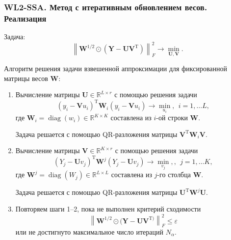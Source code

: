 \documentclass[10pt, ucs, notheorems, handout]{beamer}
\DeclareMathOperator{\diag}{diag}
\newcommand{\norm}[1]{\left\lVert#1\right\rVert}
\begin{document}
\begin{frame}
\frametitle{WL2-SSA. Метод с итеративным обновлением весов. Реализация}
\small Задача: 
\begin{equation*}
\norm{\mathbf{W}^{1/2}\odot(\mathbf{Y}-\mathbf{U}\mathbf{V}^{\mathrm{T}})}^2_F \longrightarrow \min_{\mathbf{U},\mathbf{V}}.
\end{equation*}

\alert{Алгоритм решения задачи взвешенной аппроксимации} для фиксированной матрицы весов $\mathbf{W}$:\\
\footnotesize {
\begin{enumerate}
\item Вычисление матрицы $\mathbf{U}\in \mathbb{R}^{L\times r}$ с помощью решения задачи
\begin{equation}\label{taskA}
(y_i-\mathbf{V}u_i)^\mathrm{T} \mathbf{W}_i (y_i-\mathbf{V}u_i) \to \min_{u_i},~~ i=1,\ldots L,
\end{equation} 
где $\mathbf{W}_i=\diag(w_i)\in \mathbb{R}^{K\times K}$ составлена из $i$-ой строки $\mathbf{W}$.

Задача решается с помощью QR-разложения матрицы $\mathbf{V}^\mathrm{T}\mathbf{W}_i\mathbf{V}$.
\item Вычисление матрицы $\mathbf{V}\in \mathbb{R}^{K\times r}$ с помощью решения задачи
\begin{equation}\label{taskB}
(Y_j-\mathbf{U}v_j)^\mathrm{T} \mathbf{W}^j (Y_j-\mathbf{U}v_j) \to \min_{v_j},,~~ j=1,\ldots K,
\end{equation} 
где $\mathbf{W}^j=\diag(W_j)\in \mathbb{R}^{L\times L}$ составлена из $j$-го столбца $\mathbf{W}$.

Задача решается с помощью QR-разложения матрицы $\mathbf{U}^\mathrm{T}\mathbf{W}^j\mathbf{U}$.
\item Повторяем шаги 1--2, пока не выполнен критерий сходимости
\begin{equation*}
\norm{\mathbf{W}^{1/2}\odot(\mathbf{Y}-\mathbf{U}\mathbf{V}^{\mathrm{T})}}^2_F \le \varepsilon
\end{equation*} 
или не достигнуто максимальное число итераций $N_{\alpha}$.

\end{enumerate}
}
\end{frame}
\end{document}
